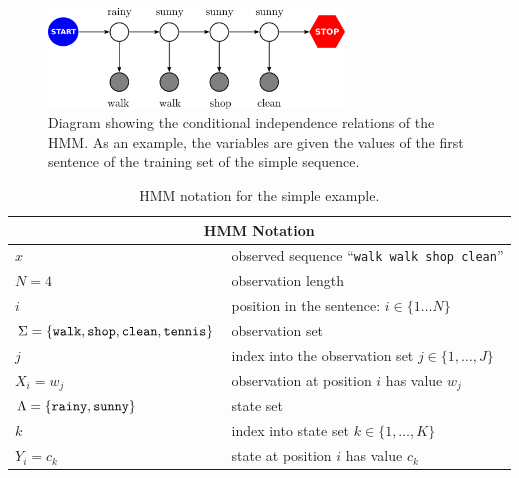 \begin{figure}[ht]
\centering
\includegraphics[width=0.7\textwidth]{figs/sequences/hmm_new}
\caption[HMM running example]{\label{fig:hmm}Diagram showing the conditional independence relations of the HMM. As an example, the variables are given the values of the first sentence of the training set of the simple sequence.}
\end{figure}

\begin{table}[h]
\begin{center}
\begin{tabular}{|l|l|}
\hline
\multicolumn{2}{|c|}{HMM Notation}\\
\hline
\hline
$x$ & observed sequence ``{\tt walk walk shop clean}'' \\
\hline
$N = 4$ & observation length \\
\hline
$i$ & position in the sentence: $i \in \{1 \ldots N\}$ \\
\hline
$\Sigma = \{\text{{\tt walk}},\text{{\tt shop}},\text{{\tt clean}},\text{{\tt tennis}}\}$ & observation set \\
\hline 
$j$ & index into the observation set $j \in \{1,\ldots, J\}$\\
\hline
$X_i = w_j$ & observation at position $i$ 
has value $w_j$\\
\hline 
$\Lambda = \{\text{{\tt rainy}},\text{{\tt sunny}}\}$ & state set\\
\hline 
$k$ & index into state set $k \in \{1,\ldots,K\}$\\
\hline
$Y_i = c_k$ & state at position $i$ has value $c_k$ \\ %
\hline
\end{tabular}
\end{center}
\caption[HMM notation]{\label{tab:hmm-simple-notation} HMM notation for the simple example.}
\end{table}



